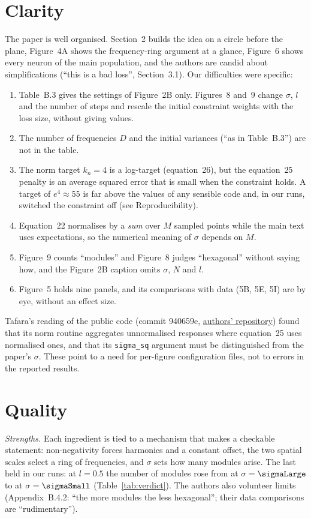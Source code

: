 \documentclass[10pt,letterpaper]{article}
\begin{document}
\section{Clarity}
The paper is well organised. Section~2 builds the idea on a circle before the plane, Figure~4A shows the frequency-ring argument at a glance, Figure~6 shows every neuron of the main population, and the authors are candid about simplifications (``this is a bad loss'', Section~3.1). Our difficulties were specific:
\begin{enumerate}[leftmargin=1.4em,itemsep=0pt,topsep=2pt,parsep=0pt]
\item Table~B.3 gives the settings of Figure~2B only. Figures~8 and~9 change $\sigma$, $l$ and the number of steps and rescale the initial constraint weights with the loss size, without giving values.
\item The number of frequencies $D$ and the initial variances (``as in Table~B.3'') are not in the table.
\item The norm target $k_n=4$ is a log-target (equation~26), but the equation~25 penalty is an average squared error that is small when the constraint holds. A target of $e^{4}\approx55$ is far above the values of any sensible code and, in our runs, switched the constraint off (see Reproducibility).
\item Equation~22 normalises by a \emph{sum} over $M$ sampled points while the main text uses expectations, so the numerical meaning of $\sigma$ depends on $M$.
\item Figure~9 counts ``modules'' and Figure~8 judges ``hexagonal'' without saying how, and the Figure~2B caption omits $\sigma$, $N$ and $l$.
\item Figure~5 holds nine panels, and its comparisons with data (5B, 5E, 5I) are by eye, without an effect size.
\end{enumerate}
Tafara's reading of the public code (commit 940659e, \href{https://github.com/WilburDoz/ICLR_Actionable_Reps}{authors' repository}) found that its norm routine aggregates unnormalised responses where equation~25 uses normalised ones, and that its \texttt{sigma\_sq} argument must be distinguished from the paper's $\sigma$. These point to a need for per-figure configuration files, not to errors in the reported results.

\section{Quality}
\emph{Strengths.} Each ingredient is tied to a mechanism that makes a checkable statement: non-negativity forces harmonics and a constant offset, the two spatial scales select a ring of frequencies, and $\sigma$ sets how many modules arise. The last held in our runs: at $l=0.5$ the number of modules rose from \sigmaLargeModules{} at $\sigma=\sigmaLarge$ to \sigmaSmallModules{} at $\sigma=\sigmaSmall$ (Table~\ref{tab:verdict}). The authors also volunteer limits (Appendix~B.4.2: ``the more modules the less hexagonal''; their data comparisons are ``rudimentary'').
\end{document}
